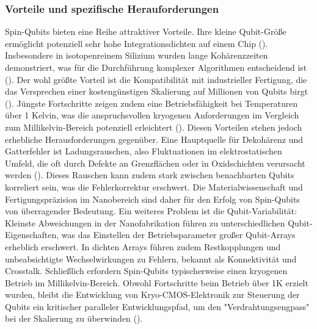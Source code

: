 \subsubsection{Vorteile und spezifische Herauforderungen}
Spin-Qubits bieten eine Reihe attraktiver Vorteile. Ihre kleine Qubit-Größe ermöglicht potenziell sehr hohe Integrationsdichten auf einem Chip (\cite{stuyckCMOSCompatibilitySemiconductor2024}).  Insbesondere in isotopenreinem Silizium wurden
lange Kohärenzzeiten demonstriert, was für die Durchführung komplexer Algorithmen entscheidend ist (\cite{stuyckCMOSCompatibilitySemiconductor2024}).  Der wohl größte Vorteil ist die
Kompatibilität mit industrieller Fertigung, die das Versprechen einer kostengünstigen Skalierung auf Millionen von Qubits birgt (\cite{stuyckCMOSCompatibilitySemiconductor2024}).  Jüngste Fortschritte zeigen zudem eine
Betriebsfähigkeit bei Temperaturen über 1 Kelvin, was die anspruchsvollen kryogenen Anforderungen im Vergleich zum Millikelvin-Bereich potenziell erleichtert (\cite{stuyckCMOSCompatibilitySemiconductor2024}). 
Diesen Vorteilen stehen jedoch erhebliche Herausforderungen gegenüber. Eine Hauptquelle für Dekohärenz und Gatterfehler ist Ladungsrauschen, also Fluktuationen im elektrostatischen Umfeld, die oft durch Defekte an Grenzflächen oder in Oxidschichten verursacht werden (\cite{stuyckCMOSCompatibilitySemiconductor2024}).  Dieses Rauschen kann zudem stark zwischen benachbarten Qubits korreliert sein, was die Fehlerkorrektur erschwert. Die Materialwissenschaft und Fertigungspräzision im Nanobereich sind daher für den Erfolg von Spin-Qubits von überragender Bedeutung. Ein weiteres Problem ist die
Qubit-Variabilität: Kleinste Abweichungen in der Nanofabrikation führen zu unterschiedlichen Qubit-Eigenschaften, was das Einstellen der Betriebsparameter großer Qubit-Arrays erheblich erschwert. In dichten Arrays führen zudem Restkopplungen und unbeabsichtigte Wechselwirkungen zu Fehlern, bekannt als
Konnektivität und Crosstalk. Schließlich erfordern Spin-Qubits typischerweise einen
kryogenen Betrieb im Millikelvin-Bereich. Obwohl Fortschritte beim Betrieb über 1K erzielt wurden, bleibt die Entwicklung von Kryo-CMOS-Elektronik zur Steuerung der Qubits ein kritischer paralleler Entwicklungspfad, um den "Verdrahtungsengpass" bei der Skalierung zu überwinden (\cite{stuyckCMOSCompatibilitySemiconductor2024}). 
